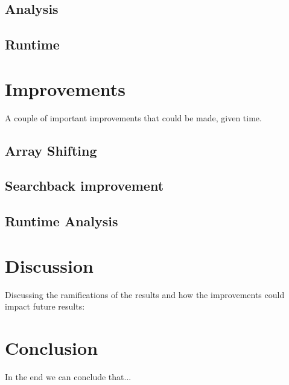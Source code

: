 \documentclass[12pt, danish, a4paper, titlepage]{article}
\begin{document}
		\subsection{Analysis}
		\subsection{Runtime}
		
	\section{Improvements}
	A couple of important improvements that could be made, given time.
		\subsection{Array Shifting}
		\subsection{Searchback improvement}
		\subsection{Runtime Analysis}
		
	\section{Discussion}
	Discussing the ramifications of the results and how the improvements could impact future results: 
	
	\section{Conclusion}
	In the end we can conclude that...
		
	
\end{document}
